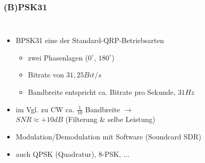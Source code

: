 \begin{frame}
    \frametitle{(B)PSK31}

    \begin{columns}[c]
        \column[c]{8cm}
            \begin{itemize}
                \item BPSK31 eine der Standard-QRP-Betriebsarten
                \begin{itemize}
                    \item zwei Phasenlagen ($0^{\circ}$, $180^{\circ}$)
                    \item Bitrate von $31,25 Bit/s$
                    \item Bandbreite entspricht ca. Bitrate pro Sekunde, $31Hz$
                \end{itemize}
                \item im Vgl. zu CW ca. $\frac{1}{10}$ Bandbreite $\rightarrow$ \\
                      $SNR \approx +10dB$ (Filterung \& selbe Leistung)
                \item Modulation/Demodulation mit Software (Soundcard SDR)
                \item auch QPSK (Quadratur), 8-PSK, ...
            \end{itemize}
        \column{2cm}
        \begin{center}

\end{center}
\end{columns}
\end{frame}
